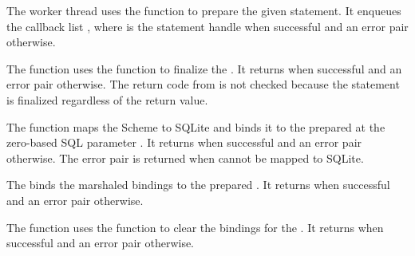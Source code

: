 The worker thread uses the  function to
prepare the given  statement. It enqueues the callback list
, where  is the
statement handle when successful and an error pair otherwise.

\begin{function}
\end{function}

The  function uses the
 function to finalize the .  It
returns  when successful and an error pair otherwise. The
return code from  is not checked because the
statement is finalized regardless of the return value.

\begin{function}
\end{function}

The  function maps the Scheme 
to SQLite and binds it to the prepared  at the zero-based SQL
parameter .  It returns  when successful and an
error pair otherwise. The error pair  is returned when  cannot be
mapped to SQLite.

\begin{function}
\end{function}

The  binds the marshaled
bindings  to the prepared .
It returns  when successful and an
error pair otherwise.

\begin{function}
\end{function}

The  function uses the
 function to clear the bindings for the
. It returns  when successful and an error
pair otherwise.

